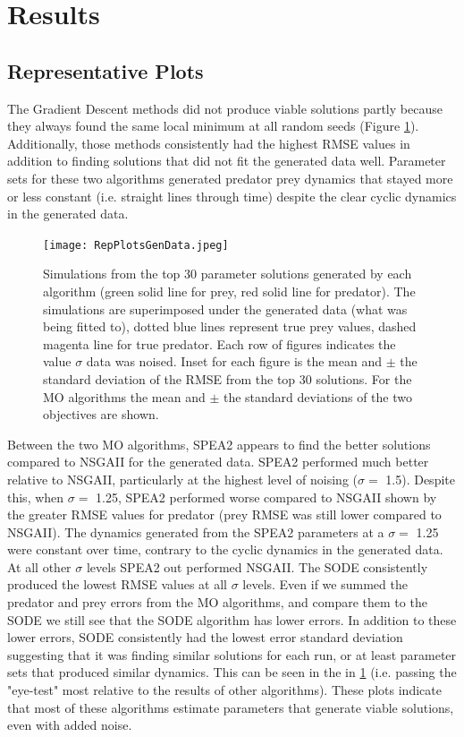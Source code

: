\documentclass[twocolumn, 9pt]{article}
\begin{document}
\section{Results}
\subsection{Representative Plots}
\indent{} The Gradient Descent methods did not produce viable solutions partly because they always found the same local minimum at all random seeds (Figure \ref{fig:RepGenData}). Additionally, those methods consistently had the highest RMSE values in addition to finding solutions that did not fit the generated data well. Parameter sets for these two algorithms generated predator prey dynamics that stayed more or less constant (i.e. straight lines through time) despite the clear cyclic dynamics in the generated data. \\

\begin{figure}[t]
    \centering
    \texttt{[image: RepPlotsGenData.jpeg]}
    \caption{Simulations from the top 30 parameter solutions generated by each algorithm (green solid line for prey, red solid line for predator). The simulations are superimposed under the generated data (what was being fitted to), dotted blue lines represent true prey values, dashed magenta line for true predator. Each row of figures indicates the value $\sigma$ data was noised. Inset for each figure is the mean and $\pm$ the standard deviation of the RMSE from the top 30 solutions. For the MO algorithms the mean and $\pm$ the standard deviations of the two objectives are shown.}
    \label{fig:RepGenData}
\end{figure}

\indent{} Between the two MO algorithms, SPEA2 appears to find the better solutions compared to NSGAII for the generated data. SPEA2 performed much better relative to NSGAII, particularly at the highest level of noising ($\sigma = $ 1.5). Despite this, when $\sigma = $ 1.25, SPEA2 performed worse compared to NSGAII shown by the greater RMSE values for predator (prey RMSE was still lower compared to NSGAII). The dynamics generated from the SPEA2 parameters at a $\sigma = $ 1.25 were constant over time, contrary to the cyclic dynamics in the generated data. At all other $\sigma$ levels SPEA2 out performed NSGAII. The SODE consistently produced the lowest RMSE values at all $\sigma$ levels. Even if we summed the predator and prey errors from the MO algorithms, and compare them to the SODE we still see that the SODE algorithm has lower errors. In addition to these lower errors, SODE consistently had the lowest error standard deviation suggesting that it was finding similar solutions for each run, or at least parameter sets that produced similar dynamics. This can be seen in the in \ref{fig:RepGenData} (i.e. passing the "eye-test" most relative to the results of other algorithms). These plots indicate that most of these algorithms estimate parameters that generate viable solutions, even with added noise.
\end{document}
